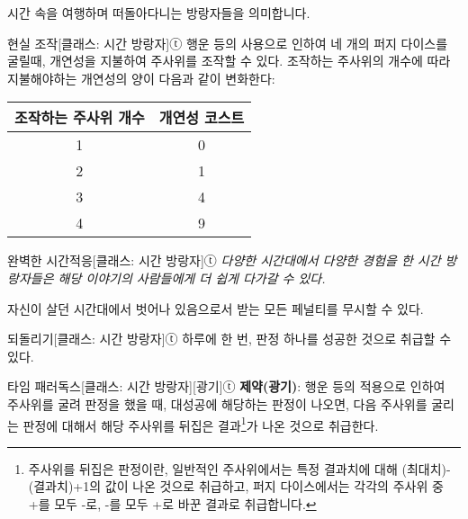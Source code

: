 \documentclass{report}
\begin{document}
	시간 속을 여행하며 떠돌아다니는 방랑자들을 의미합니다.
	
	\begin{story}{현실 조작}{[클래스: 시간 방랑자]ⓣ}
		행운 등의 사용으로 인하여 네 개의 퍼지 다이스를 굴릴때, 개연성을 지불하여 주사위를 조작할 수 있다. 조작하는 주사위의 개수에 따라 지불해야하는 개연성의 양이 다음과 같이 변화한다:
		\begin{center}
			\begin{tabular}{c|c}
				\textbf{조작하는 주사위 개수} & \textbf{개연성 코스트} \\\hline\hline
				1                             & 0                      \\\hline
				2                             & 1                      \\\hline
				3                             & 4                      \\\hline
				4                             & 9                      \\\hline
				
			\end{tabular}
		\end{center}
		
	\end{story}
	
	\begin{story}{완벽한 시간적응}{[클래스: 시간 방랑자]ⓣ}
		\textit{다양한 시간대에서 다양한 경험을 한 시간 방랑자들은 해당 이야기의 사람들에게 더 쉽게 다가갈 수 있다.}
		
		자신이 살던 시간대에서 벗어나 있음으로서 받는 모든 페널티를 무시할 수 있다.
		
	\end{story}
	
	\begin{story}{되돌리기}{[클래스: 시간 방랑자]ⓣ}
		하루에 한 번, 판정 하나를 성공한 것으로 취급할 수 있다.
		
	\end{story}
	
	\begin{story}{타임 패러독스}{[클래스: 시간 방랑자][광기]ⓣ}
		\textbf{제약(광기)}: 행운 등의 적용으로 인하여 주사위를 굴려 판정을 했을 때, 대성공에 해당하는 판정이 나오면, 다음 주사위를 굴리는 판정에 대해서 해당 주사위를 뒤집은 결과\footnote{주사위를 뒤집은 판정이란, 일반적인 주사위에서는 특정 결과치에 대해 (최대치)-(결과치)+1의 값이 나온 것으로 취급하고, 퍼지 다이스에서는 각각의 주사위 중 +를 모두 -로, -를 모두 +로 바꾼 결과로 취급합니다.}가 나온 것으로 취급한다.
		
	\end{story}
\end{document}

